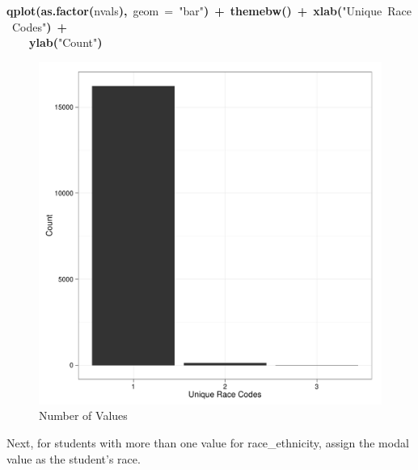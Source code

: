 \documentclass[12pt]{article}
\makeatletter
\newcommand{\hlfunctioncall}[1]{\textcolor[rgb]{0.501960784313725,0,0.329411764705882}{\textbf{#1}}}%
\newcommand{\hlstring}[1]{\textcolor[rgb]{0.6,0.6,1}{#1}}%
\newcommand{\hlkeyword}[1]{\textcolor[rgb]{0,0,0}{\textbf{#1}}}%
\newcommand{\hlargument}[1]{\textcolor[rgb]{0.690196078431373,0.250980392156863,0.0196078431372549}{#1}}%
\newcommand{\hlsymbol}[1]{\textcolor[rgb]{0,0,0}{#1}}%
\newcommand{\hlstd}[1]{\textcolor[rgb]{0,0,0}{#1}}%
\newenvironment{kframe}{%
 \def\FrameCommand##1{\hskip\@totalleftmargin \hskip-\fboxsep
 \colorbox{shadecolor}{##1}\hskip-\fboxsep
     \hskip-\linewidth \hskip-\@totalleftmargin \hskip\columnwidth}%
 \MakeFramed {\advance\hsize-\width
   \@totalleftmargin\z@ \linewidth\hsize
   \@setminipage}}%
 {\par\unskip\endMakeFramed}
\newenvironment{knitrout}{}{} %
\renewenvironment{knitrout}{\begin{footnotesize}}{\end{footnotesize}}
\makeatother
\begin{document}
\begin{knitrout}
\color{fgcolor}\begin{kframe}
\begin{flushleft}
\ttfamily\noindent
\hlfunctioncall{qplot}\hlkeyword{(}\hlfunctioncall{as.factor}\hlkeyword{(}\hlsymbol{nvals}\hlkeyword{)}\hlkeyword{,}{\ }\hlargument{geom}{\ }\hlargument{=}{\ }\hlstring{"{}bar"{}}\hlkeyword{)}{\ }\hlkeyword{+}{\ }\hlfunctioncall{theme\usebox{\hlnormalsizeboxunderscore}bw}\hlkeyword{(}\hlkeyword{)}{\ }\hlkeyword{+}{\ }\hlfunctioncall{xlab}\hlkeyword{(}\hlstring{"{}Unique{\ }Race{\ }Codes"{}}\hlkeyword{)}{\ }\hlkeyword{+}\hspace*{\fill}\\
\hlstd{}{\ }{\ }{\ }{\ }\hlfunctioncall{ylab}\hlkeyword{(}\hlstring{"{}Count"{}}\hlkeyword{)}\mbox{}
\normalfont
\end{flushleft}
\end{kframe}\begin{figure}[]


{\centering \includegraphics[width=.8\textwidth,height=.2\paperheight]{figure/unnamed-chunk-11} 

}

\caption[Number of Values]{Number of Values\label{fig:unnamed-chunk-11}}
\end{figure}

\end{knitrout}


Next, for students with more than one value for race\_ethnicity, assign the modal value as the student's race.
\end{document}

